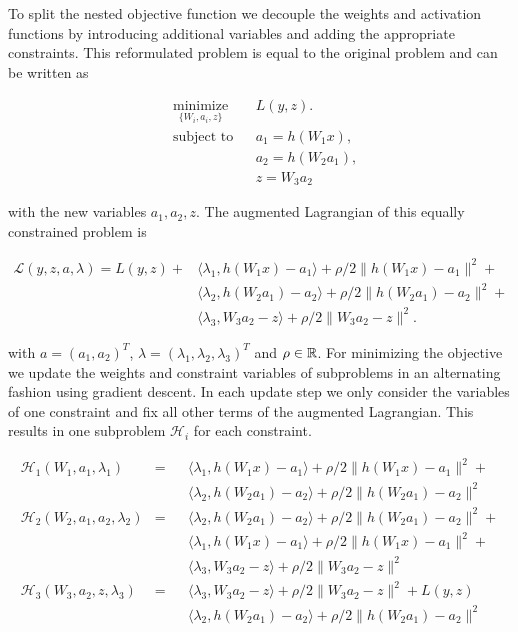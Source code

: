 \documentclass[english,11pt,a4paper]{article}
\newcommand\inner[2]{\langle #1, #2 \rangle}
\begin{document}
To split the nested objective function we decouple the weights and activation functions
by introducing additional variables and adding the appropriate constraints. This reformulated problem is equal to the original problem and can be written as

\begin{equation}
	\begin{aligned}
		& \underset{\{W_i,a_i,z\}}{\text{minimize}}
		&& L(y,z). \\
		& \text{subject to}
		&&  a_1 = h(W_1x), \\
		&&& a_2 = h(W_2a_1), \\
		&&& z = W_3a_2
	\end{aligned}
\end{equation}

with the new variables $a_1, a_2, z$. The augmented Lagrangian of this equally constrained problem is

\begin{equation}
	\begin{aligned}
		\mathcal{L}(y,z,a,\lambda) = L(y,z) + 
		& \inner{\lambda_1}{h(W_1x)-a_1} + \rho/2 \| h(W_1x)-a_1 \|^2 + \\
		& \inner{\lambda_2}{h(W_2a_1)-a_2} + \rho/2 \| h(W_2a_1)-a_2 \|^2 + \\
		& \inner{\lambda_3}{W_3a_2-z} + \rho/2 \| W_3a_2-z \|^2.
	\end{aligned}
\end{equation}

with $a = (a_1,a_2)^T$, $\lambda = (\lambda_1, \lambda_2, \lambda_3)^T$ and $\rho \in \mathbb{R}$. For minimizing the objective we update the weights and constraint variables of subproblems in an alternating fashion using gradient descent. In each update step we only consider the variables of one constraint and fix all other terms of the augmented Lagrangian. This results in one subproblem $\mathcal{H}_i$ for each constraint.

\begin{equation}
	\begin{aligned}
		\mathcal{H}_1(W_1,a_1,\lambda_1) &= && \inner{\lambda_1}{h(W_1x)-a_1} + \rho/2 \| h(W_1x)-a_1 \|^2 + \\
			& && \inner{\lambda_2}{h(W_2a_1)-a_2} + \rho/2 \| h(W_2a_1)-a_2 \|^2 \\
		\mathcal{H}_2(W_2,a_1,a_2,\lambda_2) &= && \inner{\lambda_2}{h(W_2a_1)-a_2} + \rho/2 \| h(W_2a_1)-a_2 \|^2 + \\
			& && \inner{\lambda_1}{h(W_1x)-a_1} + \rho/2 \| h(W_1x)-a_1 \|^2 + \\
			& && \inner{\lambda_3}{W_3a_2-z} + \rho/2 \| W_3a_2-z \|^2 \\
		\mathcal{H}_3(W_3,a_2,z,\lambda_3) &= && \inner{\lambda_3}{W_3a_2-z} + \rho/2 \| W_3a_2-z \|^2 + L(y,z) \\
			& && \inner{\lambda_2}{h(W_2a_1)-a_2} + \rho/2 \| h(W_2a_1)-a_2 \|^2 
	\end{aligned}
\end{equation}
\end{document}

